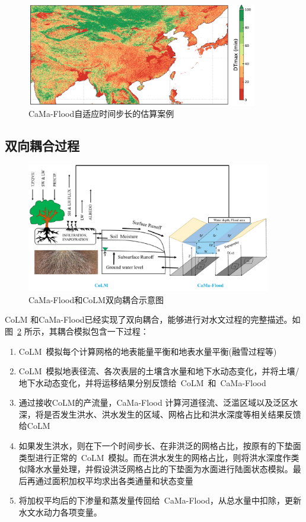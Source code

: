 {
  \begin{figure}[htbp]
    \centering
    \includegraphics[width=0.9\textwidth]{Figures/陆地表面的水分循环/自适应时间步长的估算.png}
    \caption{CaMa-Flood自适应时间步长的估算案例}
    \label{fig:自适应时间步长的估算}
  \end{figure}
}
\subsection{双向耦合过程}
{
  \begin{figure}[htbp]
    \centering
    \includegraphics[width=0.95\textwidth]{Figures/陆地表面的水分循环/双向耦合.pdf}
    \caption{CaMa-Flood和CoLM双向耦合示意图}
    \label{fig:双向耦合}
  \end{figure}
}

CoLM 和CaMa-Flood已经实现了双向耦合，能够进行对水文过程的完整描述。如图~\ref{fig:双向耦合} 所示，其耦合模拟包含一下过程：
\begin{enumerate}
  \item CoLM~模拟每个计算网格的地表能量平衡和地表水量平衡(融雪过程等)
  \item CoLM~模拟地表径流、各次表层的土壤含水量和地下水动态变化，并将土壤/地下水动态变化，并将运移结果分别反馈给~CoLM~和~CaMa-Flood~
  \item 通过接收CoLM的产流量，CaMa-Flood 计算河道径流、泛滥区域以及泛区水深，将是否发生洪水、洪水发生的区域、网格占比和洪水深度等相关结果反馈给CoLM
  \item 如果发生洪水，则在下一个时间步长、在非洪泛的网格占比，按原有的下垫面类型进行正常的~CoLM~模拟。而在洪水发生的网格占比，则将洪水深度作类似降水水量处理，并假设洪泛网格占比的下垫面为水面进行陆面状态模拟。最后再通过面积加权平均求出各类通量和状态变量
  \item 将加权平均后的下渗量和蒸发量传回给~CaMa-Flood，从总水量中扣除，更新水文水动力各项变量。

\end{enumerate}
